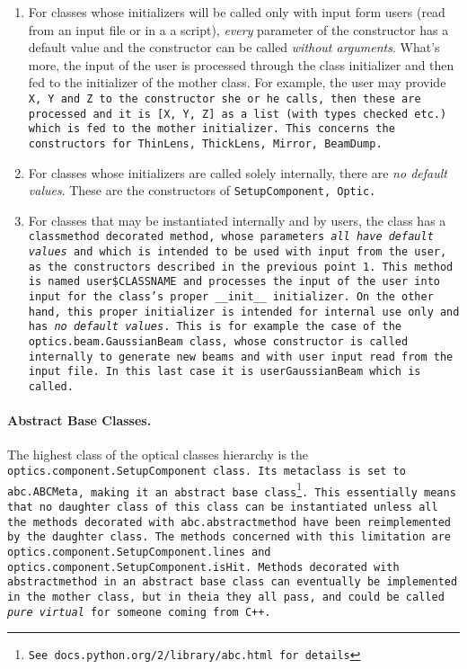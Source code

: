\documentclass{article}
\begin{document}
\begin{enumerate}
\item For classes whose initializers will be called only with input form users (read from an input file or in a a script), \textit{every} parameter of the constructor has a default value and the constructor can be called \textit{without arguments}. What's more, the input of the user is processed through the class initializer and then fed to the initializer of the mother class. For example, the user may provide \tt{X}, \tt{Y} and \tt{Z} to the constructor she or he calls, then these are processed and it is \tt{[X, Y, Z]} as a list (with types checked etc.) which is fed to the mother initializer. This concerns the constructors for \tt{ThinLens}, \tt{ThickLens}, \tt{Mirror}, \tt{BeamDump}.

\item For classes whose initializers are called solely internally, there are \textit{no default values}. These are the constructors of \tt{SetupComponent}, \tt{Optic}.

\item For classes that may be instantiated internally and by users, the class has a \tt{classmethod} decorated method, whose parameters \textit{all have default values} and which is intended to be used with input from the user, as the constructors described in the previous point 1. This method is named \tt{user\$CLASSNAME} and processes the input of the user into input for the class's proper \tt{\_\_init\_\_} initializer. On the other hand, this proper initializer is intended for internal use only and has \textit{no default values}. This is for example the case of the \tt{optics.beam.GaussianBeam} class, whose constructor is called internally to generate new beams and with user input read from the input file. In this last case it is \tt{userGaussianBeam} which is called.
\end{enumerate}

\paragraph{Abstract Base Classes.}The highest class of the optical classes hierarchy is the \tt{optics.component.SetupComponent} class. Its metaclass is set to \tt{abc.ABCMeta}, making it an abstract base class\footnote{See \tt{docs.python.org/2/library/abc.html} for details}. This essentially means that no daughter class of this class can be instantiated unless all the methods decorated with \tt{abc.abstractmethod} have been reimplemented by the daughter class. The methods concerned with this limitation are \tt{optics.component.SetupComponent.lines} and \tt{optics.component.SetupComponent.isHit}. Methods decorated with \tt{abstractmethod} in an abstract base class can eventually be implemented in the mother class, but in theia they all \tt{pass}, and could be called \textit{pure virtual} for someone coming from C++.
\end{document}
